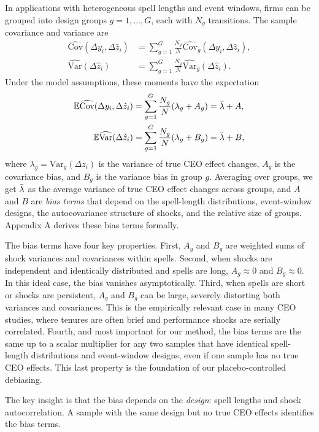 \documentclass[11pt,a4paper]{article}
\newcommand{\Var}{\text{Var}}
\newcommand{\Cov}{\text{Cov}}
\begin{document}
In applications with heterogeneous spell lengths and event windows, firms can be grouped into design groups $g=1,\ldots,G$, each with $N_g$ transitions. The sample covariance and variance are
\begin{align}
\widehat{\Cov}(\Delta y_i,\Delta \hat z_i) &= \sum_{g=1}^G \frac{N_g}{N} \widehat{\Cov}_g(\Delta y_i,\Delta \hat z_i),\\
\widehat{\Var}(\Delta \hat z_i) &= \sum_{g=1}^G \frac{N_g}{N} \widehat{\Var}_g(\Delta \hat z_i).
\end{align}
Under the model assumptions, these moments have the expectation
\begin{align}
\mathbb E\widehat{\Cov}(\Delta y_i,\Delta \hat z_i) &= 
  \sum_{g=1}^G \frac{N_g}{N} (\lambda_g + A_g) = \Bar\lambda + A,\\
\mathbb E\widehat{\Var}(\Delta \hat z_i) &= 
\sum_{g=1}^G \frac{N_g}{N} (\lambda_g + B_g) = \Bar\lambda + B,
\end{align}
where $\lambda_g = \Var_g(\Delta z_i)$ is the variance of true CEO effect changes, $A_g$ is the covariance bias, and $B_g$ is the variance bias in group $g$. Averaging over groups, we get $\Bar\lambda$ as the average variance of true CEO effect changes across groups, and $A$ and $B$ are \emph{bias terms} that depend on the spell-length distributions, event-window designs, the autocovariance structure of shocks, and the relative size of groups. Appendix A derives these bias terms formally.

The bias terms have four key properties. First, $A_g$ and $B_g$ are weighted sums of shock variances and covariances within spells. Second, when shocks are independent and identically distributed and spells are long, $A_g\approx 0$ and $B_g\approx 0$. In this ideal case, the bias vanishes asymptotically. Third, when spells are short or shocks are persistent, $A_g$ and $B_g$ can be large, severely distorting both variances and covariances. This is the empirically relevant case in many CEO studies, where tenures are often brief and performance shocks are serially correlated. Fourth, and most important for our method, the bias terms are the same up to a scalar multiplier for any two samples that have identical spell-length distributions and event-window designs, even if one sample has no true CEO effects. This last property is the foundation of our placebo-controlled debiasing.

The key insight is that the bias depends on the \emph{design}: spell lengths and shock autocorrelation. A sample with the same design but no true CEO effects identifies the bias terms. 
\end{document}
